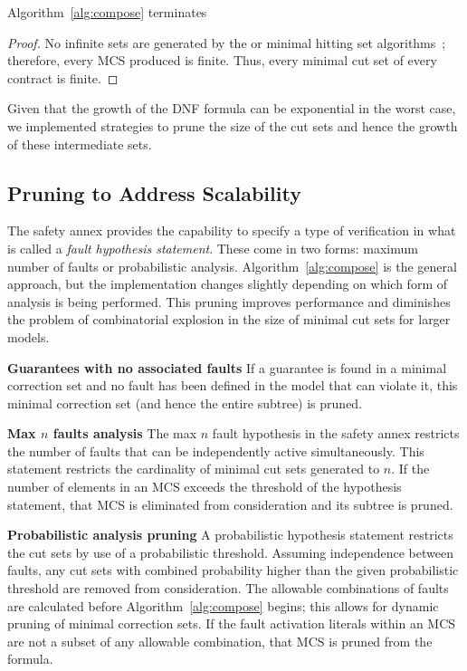 \begin{theorem}
Algorithm~\ref{alg:compose} terminates
\begin{proof}
No infinite sets are generated by the \aivcalg or minimal hitting set algorithms~\cite{Ghassabani2017EfficientGO,murakami2013efficient}; therefore, every MCS produced is finite. Thus, every minimal cut set of every contract is finite.
\end{proof}
\end{theorem}

Given that the growth of the DNF formula can be exponential in the worst case, we implemented strategies to prune the size of the cut sets and hence the growth of these intermediate sets. 


\subsection{Pruning to Address Scalability}
The safety annex provides the capability to specify a type of verification in what is called a \textit{fault hypothesis statement}. These come in two forms: maximum number of faults or probabilistic analysis. Algorithm~\ref{alg:compose} is the general approach, but the implementation changes slightly depending on which form of analysis is being performed. This pruning improves performance and diminishes the problem of combinatorial explosion in the size of minimal cut sets for larger models. 

\textbf{Guarantees with no associated faults} If a guarantee is found in a minimal correction set and no fault has been defined in the model that can violate it, this minimal correction set (and hence the entire subtree) is pruned.

\textbf{Max $n$ faults analysis} The max $n$ fault hypothesis in the safety annex restricts the number of faults that can be independently active simultaneously. This statement restricts the cardinality of minimal cut sets generated to $n$. If the number of elements in an MCS exceeds the threshold of the hypothesis statement, that MCS is eliminated from consideration and its subtree is pruned.


\textbf{Probabilistic analysis pruning} A probabilistic hypothesis statement restricts the cut sets by use of a probabilistic threshold. Assuming independence between faults, any cut sets with combined probability higher than the given probabilistic threshold are removed from consideration. The allowable combinations of faults are calculated before Algorithm~\ref{alg:compose} begins; this allows for dynamic pruning of minimal correction sets. If the fault activation literals within an MCS are not a subset of any allowable combination, that MCS is pruned from the formula. 

